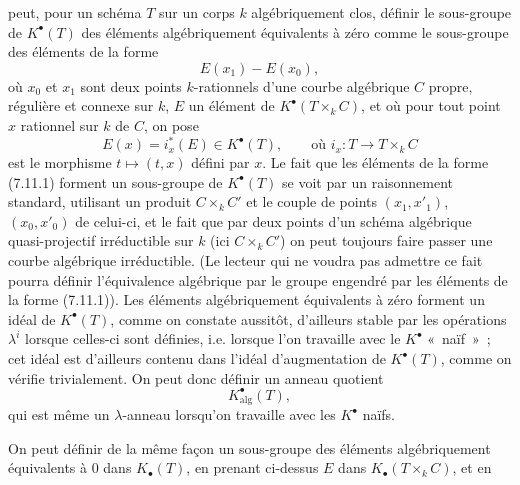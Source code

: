 peut, pour un schéma \(T\) sur un corps \(k\) algébriquement clos, définir le sous-groupe de \(K^\bullet(T)\) des éléments algébriquement équivalents à zéro comme le sous-groupe des éléments de la forme
\begin{equation}\tag{7.11.1}
  E(x_1)-E(x_0),
\end{equation}
où \(x_0\) et \(x_1\) sont deux points \(k\)-rationnels d'une courbe algébrique \(C\) propre, régulière et connexe sur \(k\), \(E\) un élément de \(K^\bullet(T\times_k C)\), et où pour tout point \(x\) rationnel sur \(k\) de \(C\), on pose
\[
  E(x)=i_x^*(E)\in K^\bullet(T),\qquad\text{où }
  i_x:T\longrightarrow T\times_k C
\]
est le morphisme \(t\mapsto(t,x)\) défini par \(x\). Le fait que les éléments de la forme (7.11.1) forment un sous-groupe de \(K^\bullet(T)\) se voit par un raisonnement standard, utilisant un produit \(C\times_k C'\) et le couple de points \((x_1,x'_1)\), \((x_0,x'_0)\) de celui-ci, et le fait que par deux points d'un schéma algébrique quasi-projectif irréductible sur \(k\) (ici \(C\times_k C'\)) on peut toujours faire passer une courbe algébrique irréductible. (Le lecteur qui ne voudra pas admettre ce fait pourra définir l'équivalence algébrique par le groupe engendré par les éléments de la forme (7.11.1)). Les éléments algébriquement équivalents à zéro forment un idéal de \(K^\bullet(T)\), comme on constate aussitôt, d'ailleurs stable par les opérations \(\lambda^i\) lorsque celles-ci sont définies, i.e. lorsque l'on travaille avec le \(K^\bullet\) «~naïf~»~; cet idéal est d'ailleurs contenu dans l'idéal d'augmentation de \(K^\bullet(T)\), comme on vérifie trivialement. On peut donc définir un anneau quotient
\begin{equation}\tag{7.11.2}
  K^\bullet_{\mathrm{alg}}(T),
\end{equation}
qui est même un \(\lambda\)-anneau lorsqu'on travaille avec les \(K^\bullet\) naïfs.

On peut définir de la même façon un sous-groupe des éléments algébriquement équivalents à 0 dans \(K_\bullet(T)\), en prenant ci-dessus \(E\) dans \(K_\bullet(T\times_k C)\), et en
